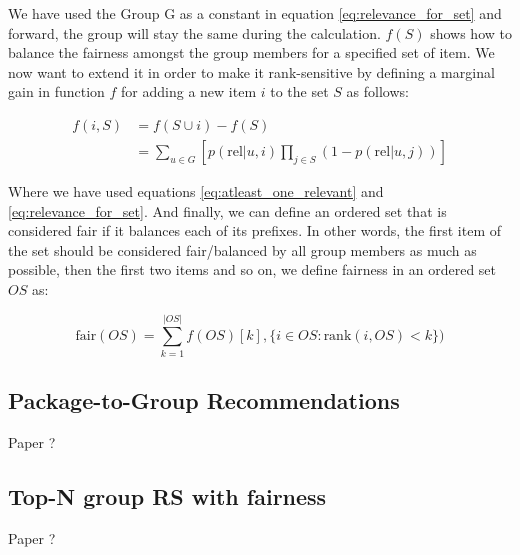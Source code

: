 We have used the Group G as a constant in equation \ref{eq:relevance_for_set} and forward, the group will stay the same during the calculation. $f(S)$ shows how to balance the fairness amongst the group members for a specified set of item. We now want to extend it in order to make it rank-sensitive by defining a marginal gain in function $f$ for adding a new item $i$ to the set $S$ as follows:

\begin{equation} \label{eq:relevance_for_set_add}
\begin{aligned}
    f(i, S) &= f(S \cup {i}) - f(S) \\
    & = \sum_{u \in G}{\left[p(\textrm{rel}|u, i) \prod_{j \in S}{(1 - p(\textrm{rel}|u, j))}\right]}
\end{aligned}
\end{equation}

Where we have used equations \ref{eq:atleast_one_relevant} and \ref{eq:relevance_for_set}. And finally, we can define an ordered set that is considered fair if it balances each of its prefixes. In other words, the first item of the set should be considered fair/balanced by all group members as much as possible, then the first two items and so on, we define fairness in an ordered set $OS$ as:

\begin{equation}
    \textrm{fair}(OS) = \sum_{k=1}^{|OS|}{f(OS)[k], \{i \in OS : \textrm{rank}(i, OS) < k\})}
\end{equation}


\subsection{Package-to-Group Recommendations}
Paper \cite{serbos_2017_fairness_packages_to_group_rec}?


\subsection{Top-N group RS with fairness}
Paper \cite{sacharidis_2019_top_n_with_fairness}?